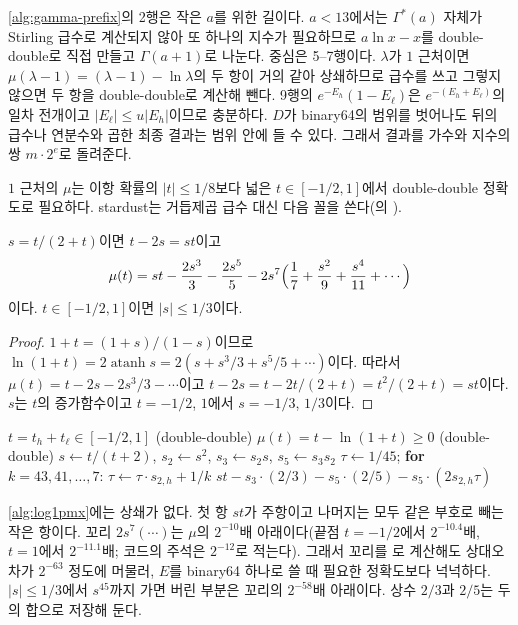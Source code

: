 \cref{alg:gamma-prefix}의 2행은 작은 $a$를 위한 길이다. $a<13$에서는 $\Gamma^*(a)$ 자체가 Stirling 급수로 계산되지 않아 또 하나의 지수가 필요하므로 $a\ln x-x$를 double-double로 직접 만들고 $\Gamma(a+1)$로 나눈다. 중심은 5--7행이다. $\lambda$가 $1$ 근처이면 $\mu(\lambda-1)=(\lambda-1)-\ln\lambda$의 두 항이 거의 같아 상쇄하므로 급수를 쓰고 그렇지 않으면 두 항을 double-double로 계산해 뺀다. 9행의 $e^{-E_h}(1-E_\ell)$은 $e^{-(E_h+E_\ell)}$의 일차 전개이고 $|E_\ell|\le u|E_h|$이므로 충분하다. $D$가 binary64의 범위를 벗어나도 뒤의 급수나 연분수와 곱한 최종 결과는 범위 안에 들 수 있다. 그래서 결과를 가수와 지수의 쌍 $m\cdot2^e$로 돌려준다.

$1$ 근처의 $\mu$는 이항 확률의 $|t|\le1/8$보다 넓은 $t\in[-1/2,1]$에서 double-double 정확도로 필요하다. stardust는 거듭제곱 급수 대신 다음 꼴을 쓴다(의 ).

\begin{proposition}
\label{prop:log1pmx}
$s=t/(2+t)$이면 $t-2s=st$이고
\[
\mu(t)=st-\frac{2s^3}{3}-\frac{2s^5}{5}-2s^7\Bigl(\frac17+\frac{s^2}9+\frac{s^4}{11}+\cdots\Bigr)
\]
이다. $t\in[-1/2,1]$이면 $|s|\le1/3$이다.
\end{proposition}

\begin{proof}
$1+t=(1+s)/(1-s)$이므로 $\ln(1+t)=2\operatorname{atanh}s=2(s+s^3/3+s^5/5+\cdots)$이다. 따라서 $\mu(t)=t-2s-2s^3/3-\cdots$이고 $t-2s=t-2t/(2+t)=t^2/(2+t)=st$이다. $s$는 $t$의 증가함수이고 $t=-1/2$, $1$에서 $s=-1/3$, $1/3$이다.
\end{proof}

\begin{algorithm}[htbp]
\begin{algorithmic}[1]
\Require $t=t_h+t_\ell\in[-1/2,1]$ (double-double)
\Ensure $\mu(t)=t-\ln(1+t)\ge0$ (double-double)
\State $s\gets t/(t+2)$, $s_2\gets s^2$, $s_3\gets s_2s$, $s_5\gets s_3s_2$ 
\State $\tau\gets1/45$; \textbf{for} $k=43,41,\dots,7$: $\tau\gets\tau\cdot s_{2,h}+1/k$ 
\State \Return $st-s_3\cdot(2/3)-s_5\cdot(2/5)-s_5\cdot(2s_{2,h}\tau)$
\end{algorithmic}
\caption{double-double $\mu(t)$ (stardust )}
\label{alg:log1pmx}
\end{algorithm}

\cref{alg:log1pmx}에는 상쇄가 없다. 첫 항 $st$가 주항이고 나머지는 모두 같은 부호로 빼는 작은 항이다. 꼬리 $2s^7(\cdots)$는 $\mu$의 $2^{-10}$배 아래이다(끝점 $t=-1/2$에서 $2^{-10.4}$배, $t=1$에서 $2^{-11.1}$배; 코드의 주석은 $2^{-12}$로 적는다). 그래서 꼬리를 로 계산해도 상대오차가 $2^{-63}$ 정도에 머물러, $E$를 binary64 하나로 쓸 때 필요한 정확도보다 넉넉하다. $|s|\le1/3$에서 $s^{45}$까지 가면 버린 부분은 꼬리의 $2^{-58}$배 아래이다. 상수 $2/3$과 $2/5$는 두 의 합으로 저장해 둔다.


